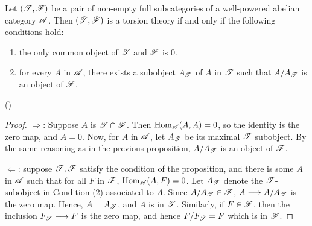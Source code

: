 \begin{prop}\label{prop_tt_suff_cond}
Let $(\mathscr{T}, \mathscr{F})$ be a pair of non-empty full subcategories
of a well-powered abelian category $\mathscr{A}$. Then $(\mathscr{T}, 
\mathscr{F})$ is a torsion theory if and only if the following 
conditions hold:
\begin{enumerate}
\item the only common object of $\mathscr{T}$ and $\mathscr{F}$ is 0.

\item for every $A$ in $\mathscr{A}$, there exists a subobject 
$A_{\mathscr{T}}$ of $A$ in $\mathscr{T}$ such that $A/A_{\mathscr{T}}$ 
is an object of $\mathscr{F}$.
\end{enumerate}
(\CF \cite[I2.7]{BJV})
\end{prop}
\begin{proof}
\noindent $\Rightarrow$: Suppose $A$ is $\mathscr{T} \cap \mathscr{F}$.
Then $\mathrm{Hom}_{\mathscr{A}}(A,A) = 0$, so the identity is the zero map, and
$A = 0$. Now, for $A$ in $\mathscr{A}$, let $A_{\mathscr{T}}$ be its maximal
$\mathscr{T}$ subobject. By the same reasoning as in the previous
proposition, $A/A_{\mathscr{T}}$ is an object of $\mathscr{F}$.

\vskip 10pt
\noindent $\Leftarrow$: suppose $\mathscr{T}, \mathscr{F}$ satisfy the 
condition of the proposition, and there is some $A$ in $\mathscr{A}$ 
such that for all $F$ in $\mathscr{F}$, $\mathrm{Hom}_{\mathscr{A}}(A, F) = 0$. Let
$A_{\mathscr{T}}$ denote the $\mathscr{T}$-subobject in Condition (2) 
associated to $A$. Since $A/A_{\mathscr{T}} \in \mathscr{F}$, $A \longrightarrow 
A/A_{\mathscr{T}}$ is the zero map. Hence, $A = A_{\mathscr{T}}$, and
$A$ is in $\mathscr{T}$. Similarly, if $F \in \mathscr{F}$, then the 
inclusion $F_{\mathscr{T}} \longrightarrow F$ is the zero map, and hence 
$F/F_{\mathscr{T}} = F$ which is in $\mathscr{F}$.
\end{proof}

